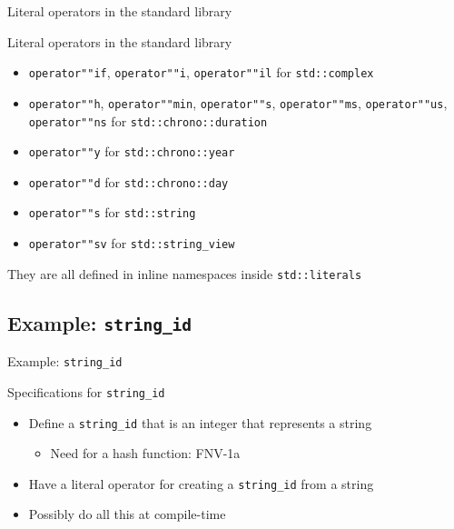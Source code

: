 \begin{frame}{Literal operators in the standard library}{}
  \begin{block}{Literal operators in the standard library}
    \begin{itemize}
    \item
      \lstinline!operator""if!, \lstinline!operator""i!, \lstinline!operator""il! for \lstinline!std::complex!
    \item
      \lstinline!operator""h!, \lstinline!operator""min!, \lstinline!operator""s!, \lstinline!operator""ms!, \lstinline!operator""us!, \lstinline!operator""ns! for \lstinline!std::chrono::duration!
    \item
      \lstinline!operator""y! for \lstinline!std::chrono::year!
    \item
      \lstinline!operator""d! for \lstinline!std::chrono::day!
    \item
      \lstinline!operator""s! for \lstinline!std::string!
    \item
      \lstinline!operator""sv! for \lstinline!std::string_view!
    \end{itemize}

    They are all defined in inline namespaces inside \lstinline!std::literals!
  \end{block}
\end{frame}

\subsection{Example: \texttt{string\_id}}

\begin{frame}{Example: \texttt{string\_id}}{}
  \begin{block}{Specifications for \texttt{string\_id}}
    \begin{itemize}
    \item
      Define a \lstinline!string_id! that is an integer that represents a string
      \begin{itemize}
      \item
        Need for a hash function: FNV-1a
      \end{itemize}
    \item
      Have a literal operator for creating a \lstinline!string_id! from a string
    \item
      Possibly do all this at compile-time
    \end{itemize}
  \end{block}
\end{frame}

